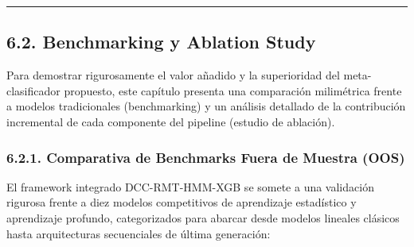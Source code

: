 \documentclass[
  12pt,
]{article}
\begin{document}
\begin{center}\rule{0.5\linewidth}{0.5pt}\end{center}

\subsection{6.2. Benchmarking y Ablation Study}\label{capuxedtulo-6a-benchmarking-y-ablation-study}

Para demostrar rigurosamente el valor añadido y la superioridad del
meta-clasificador propuesto, este capítulo presenta una comparación
milimétrica frente a modelos tradicionales (benchmarking) y un análisis
detallado de la contribución incremental de cada componente del pipeline
(estudio de ablación).

\subsubsection{6.2.1. Comparativa de Benchmarks Fuera de Muestra (OOS)}\label{a.1.-comparativa-de-benchmarks-fuera-de-muestra-oos}

El framework integrado DCC-RMT-HMM-XGB se somete a una validación
rigurosa frente a diez modelos competitivos de aprendizaje estadístico y
aprendizaje profundo, categorizados para abarcar desde modelos lineales
clásicos hasta arquitecturas secuenciales de última generación:
\end{document}
